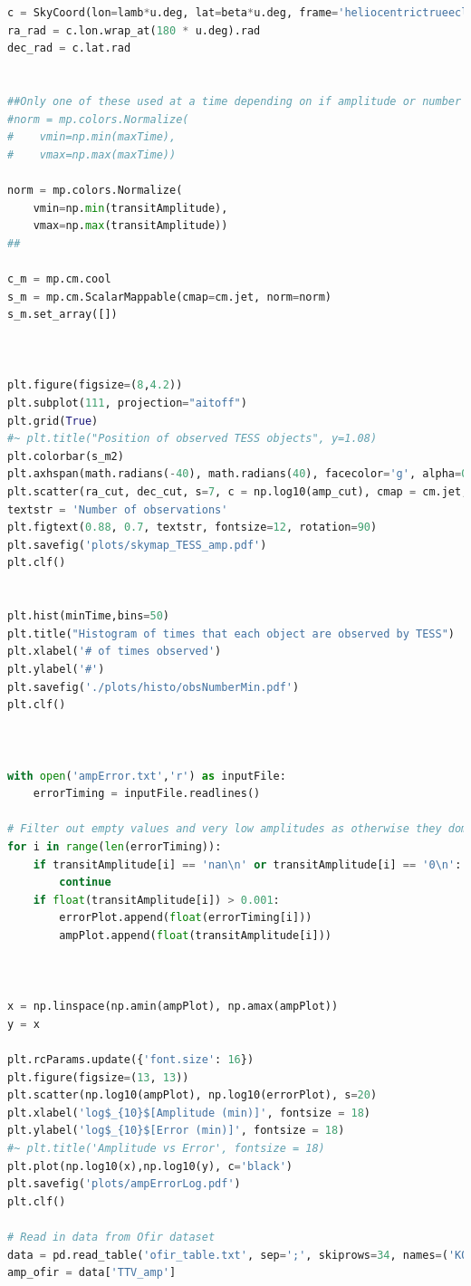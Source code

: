\documentclass[12pt]{report}
\begin{document}
\begin{appendix}
\begin{lstlisting}[language=Python]
c = SkyCoord(lon=lamb*u.deg, lat=beta*u.deg, frame='heliocentrictrueecliptic')
ra_rad = c.lon.wrap_at(180 * u.deg).rad			
dec_rad = c.lat.rad


##Only one of these used at a time depending on if amplitude or number of observations are of interest
#norm = mp.colors.Normalize(
#    vmin=np.min(maxTime),
#    vmax=np.max(maxTime))
    
norm = mp.colors.Normalize(
    vmin=np.min(transitAmplitude),
    vmax=np.max(transitAmplitude)) 
##

c_m = mp.cm.cool
s_m = mp.cm.ScalarMappable(cmap=cm.jet, norm=norm)
s_m.set_array([])



plt.figure(figsize=(8,4.2))
plt.subplot(111, projection="aitoff")
plt.grid(True)
#~ plt.title("Position of observed TESS objects", y=1.08)
plt.colorbar(s_m2)
plt.axhspan(math.radians(-40), math.radians(40), facecolor='g', alpha=0.1)
plt.scatter(ra_cut, dec_cut, s=7, c = np.log10(amp_cut), cmap = cm.jet, alpha = 0.5)
textstr = 'Number of observations'
plt.figtext(0.88, 0.7, textstr, fontsize=12, rotation=90)
plt.savefig('plots/skymap_TESS_amp.pdf')
plt.clf()


plt.hist(minTime,bins=50)
plt.title("Histogram of times that each object are observed by TESS")
plt.xlabel('# of times observed')
plt.ylabel('#')
plt.savefig('./plots/histo/obsNumberMin.pdf')
plt.clf()

	

with open('ampError.txt','r') as inputFile:
	errorTiming = inputFile.readlines()

# Filter out empty values and very low amplitudes as otherwise they dominate
for i in range(len(errorTiming)):
	if transitAmplitude[i] == 'nan\n' or transitAmplitude[i] == '0\n': 
		continue
	if float(transitAmplitude[i]) > 0.001:
		errorPlot.append(float(errorTiming[i])) 
		ampPlot.append(float(transitAmplitude[i])) 

	

x = np.linspace(np.amin(ampPlot), np.amax(ampPlot))
y = x

plt.rcParams.update({'font.size': 16})
plt.figure(figsize=(13, 13))
plt.scatter(np.log10(ampPlot), np.log10(errorPlot), s=20)
plt.xlabel('log$_{10}$[Amplitude (min)]', fontsize = 18)
plt.ylabel('log$_{10}$[Error (min)]', fontsize = 18)
#~ plt.title('Amplitude vs Error', fontsize = 18)
plt.plot(np.log10(x),np.log10(y), c='black')
plt.savefig('plots/ampErrorLog.pdf')
plt.clf()

# Read in data from Ofir dataset
data = pd.read_table('ofir_table.txt', sep=';', skiprows=34, names=('KOI_num', 'newDetFlag', 'TTVfre', 'TTV+uncer', 'TTV-uncer', 'TTV_per', 'Delta_chi', 'chi_area', 'chi_single', 'chi_RMS', 'cho_correl', 'TTV_amp', 'TTV_amp+_uncer', 'TTV_amp-_uncer', 'TTV_ref', 'TTV_ref+_uncer', 'TTV_ref-_uncer', 'cofid', 'STD_error', '20', '21', '22', '23', '24'))
amp_ofir = data['TTV_amp']


\end{lstlisting}
\end{appendix}
\end{document}
